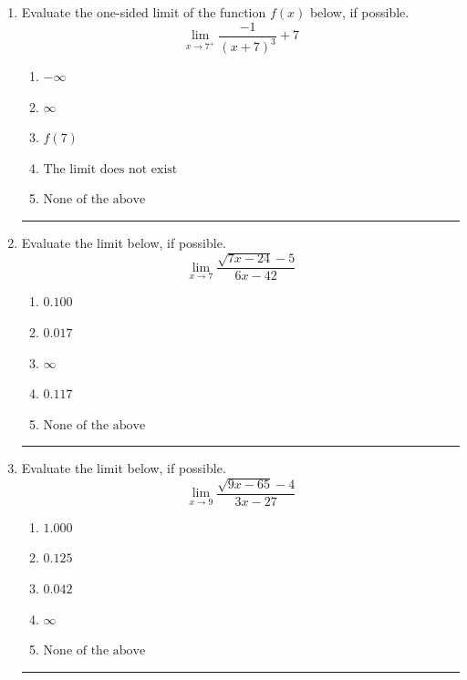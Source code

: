 \documentclass[14pt]{extbook}
\newcommand{\litem}[1]{\item#1\hspace*{-1cm}\rule{\textwidth}{0.4pt}}
\begin{document}
\begin{enumerate}
{\begin{enumerate}[label=\Alph*.]
\end{enumerate} }
\litem{
Evaluate the one-sided limit of the function $f(x)$ below, if possible.\[ \lim_{x \rightarrow 7^+} \frac{-1}{(x+7)^3}+7 \]\begin{enumerate}[label=\Alph*.]
\item \( -\infty \)
\item \( \infty \)
\item \( f(7) \)
\item \( \text{The limit does not exist} \)
\item \( \text{None of the above} \)

\end{enumerate} }
\litem{
Evaluate the limit below, if possible.\[ \lim_{x \rightarrow 7} \frac{\sqrt{7x - 24} - 5}{6x - 42} \]\begin{enumerate}[label=\Alph*.]
\item \( 0.100 \)
\item \( 0.017 \)
\item \( \infty \)
\item \( 0.117 \)
\item \( \text{None of the above} \)

\end{enumerate} }
\litem{
Evaluate the limit below, if possible.\[ \lim_{x \rightarrow 9} \frac{\sqrt{9x - 65} - 4}{3x - 27} \]\begin{enumerate}[label=\Alph*.]
\item \( 1.000 \)
\item \( 0.125 \)
\item \( 0.042 \)
\item \( \infty \)
\item \( \text{None of the above} \)


\end{enumerate}}
\end{enumerate}
\end{document}
